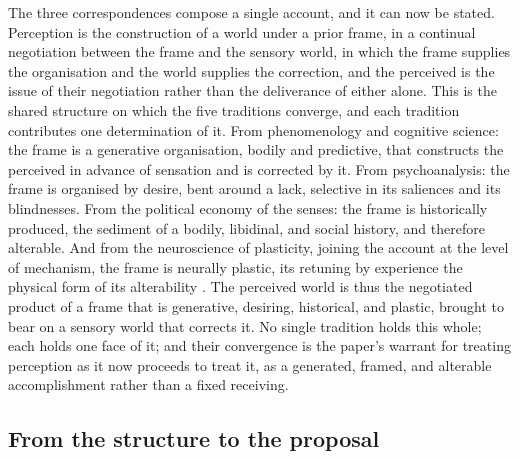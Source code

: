 The three correspondences compose a single account, and it can now be stated. Perception is the construction of a world under a prior frame, in a continual negotiation between the frame and the sensory world, in which the frame supplies the organisation and the world supplies the correction, and the perceived is the issue of their negotiation rather than the deliverance of either alone. This is the shared structure on which the five traditions converge, and each tradition contributes one determination of it. From phenomenology and cognitive science: the frame is a generative organisation, bodily and predictive, that constructs the perceived in advance of sensation and is corrected by it. From psychoanalysis: the frame is organised by desire, bent around a lack, selective in its saliences and its blindnesses. From the political economy of the senses: the frame is historically produced, the sediment of a bodily, libidinal, and social history, and therefore alterable. And from the neuroscience of plasticity, joining the account at the level of mechanism, the frame is neurally plastic, its retuning by experience the physical form of its alterability \parencite{gilbert2001,watanabe2015}. The perceived world is thus the negotiated product of a frame that is generative, desiring, historical, and plastic, brought to bear on a sensory world that corrects it. No single tradition holds this whole; each holds one face of it; and their convergence is the paper's warrant for treating perception as it now proceeds to treat it, as a generated, framed, and alterable accomplishment rather than a fixed receiving.

\subsection{From the structure to the proposal}
\label{p23:sub:conv-proposal}

